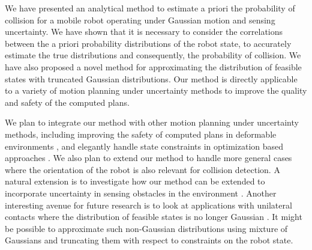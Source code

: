 We have presented an analytical method to estimate a priori the probability of collision for a mobile robot operating under Gaussian motion and sensing uncertainty. We have shown that it is necessary to consider the correlations between the a priori probability distributions of the robot state, to accurately estimate the true distributions and consequently, the probability of collision. We have also proposed a novel method for approximating the distribution of feasible states with truncated Gaussian distributions. Our method is directly applicable to a variety of motion planning under uncertainty methods \cite{vandenBerg11_IJRR, Vitus11_ICRA, Bry11_ICRA, vandenBerg11_ISRR, Toussaint09_ICML} to improve the quality and safety of the computed plans.

We plan to integrate our method with other motion planning under uncertainty methods, including improving the safety of computed plans in deformable environments \cite{Patil11_RSS}, and elegantly handle state constraints in optimization based approaches \cite{vandenBerg11_ISRR}. We also plan to extend our method to handle more general cases where the orientation of the robot is also relevant for collision detection. A natural extension is to investigate how our method can be extended to incorporate uncertainty in sensing obstacles in the environment \cite{Guibas08_WAFR}. Another interesting avenue for future research is to look at applications with unilateral contacts where the distribution of feasible states is no longer Gaussian \cite{Erez10_UAI}. It might be possible to approximate such non-Gaussian distributions using mixture of Gaussians and truncating them with respect to constraints on the robot state. 